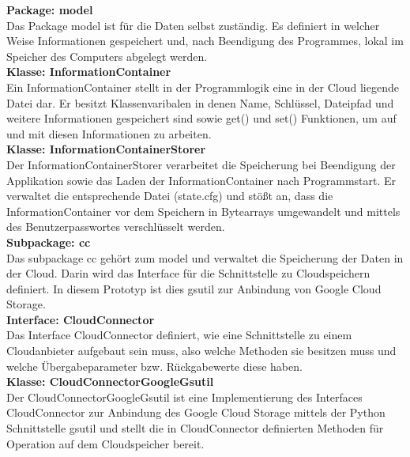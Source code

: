 \documentclass[12pt,a4paper,bibliography=totocnumbered,listof=totocnumbered]{scrartcl}
\begin{document}
\textbf{Package: model}\\
Das Package model ist für die Daten selbst zuständig. Es definiert in welcher Weise Informationen gespeichert und, nach Beendigung des Programmes, lokal im Speicher des Computers abgelegt werden.\\
\textbf{Klasse: InformationContainer}\\
Ein InformationContainer stellt in der Programmlogik eine in der Cloud liegende Datei dar. Er besitzt Klassenvaribalen in denen Name, Schlüssel, Dateipfad und weitere Informationen gespeichert sind sowie get() und set() Funktionen, um auf und mit diesen Informationen zu arbeiten.\\
\textbf{Klasse: InformationContainerStorer}\\
Der InformationContainerStorer verarbeitet die Speicherung bei Beendigung der Applikation sowie das Laden der InformationContainer nach Programmstart. Er verwaltet die entsprechende Datei (state.cfg) und stößt an, dass die  InformationContainer vor dem Speichern in Bytearrays umgewandelt und mittels des Benutzerpasswortes verschlüsselt werden.\\
\textbf{Subpackage: cc}\\
Das subpackage cc gehört zum model und verwaltet die Speicherung der Daten in der Cloud. Darin wird das Interface für die Schnittstelle zu Cloudspeichern definiert. In diesem Prototyp ist dies gsutil zur Anbindung von Google Cloud Storage.\\
\textbf{Interface: CloudConnector}\\
Das Interface CloudConnector definiert, wie eine Schnittstelle zu einem Cloudanbieter aufgebaut sein muss, also welche Methoden sie besitzen muss und welche Übergabeparameter bzw. Rückgabewerte diese haben.\\
\textbf{Klasse: CloudConnectorGoogleGsutil}\\
Der CloudConnectorGoogleGsutil ist eine Implementierung des Interfaces CloudConnector zur Anbindung des Google Cloud Storage mittels der Python Schnittstelle gsutil und stellt die in CloudConnector definierten Methoden für Operation auf dem Cloudspeicher bereit.\\
\end{document}
